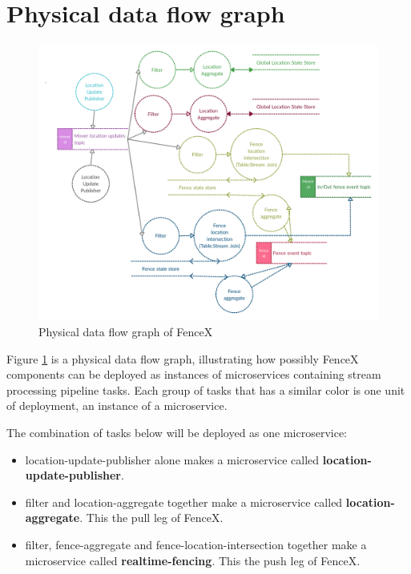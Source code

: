 \documentclass[a4]{report}
\begin{document}
    \section{Physical data flow graph}
    \begin{figure}[ht]
        \centering
        \caption{Physical data flow graph of FenceX}
        \label{fig:physical-dfg}
        \includegraphics[width=\linewidth ,scale=0.2]{images/physical-data-flow-diagram.png}
    \end{figure}

    \clearpage

    Figure \ref{fig:physical-dfg} is a physical data flow graph, illustrating how possibly FenceX components can be
    deployed as instances of microservices containing stream processing pipeline tasks.
    Each group of tasks that has a similar color is one unit of deployment, an instance of a microservice.

    The combination of tasks below will be deployed as one microservice:
    \begin{itemize}
        \item{location-update-publisher} alone makes a microservice called \textbf{location-update-publisher}.
        \item{filter and location-aggregate} together make a microservice called \textbf{location-aggregate}.
        This the pull leg of FenceX.
        \item{filter, fence-aggregate and fence-location-intersection} together make a microservice called \textbf{realtime-fencing}.
        This the push leg of FenceX.
    \end{itemize}
\end{document}
